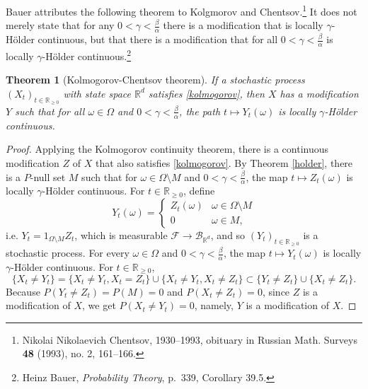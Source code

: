 \documentclass{article}
\newtheorem{theorem}{Theorem}
\theoremstyle{definition}
\begin{document}
Bauer attributes the following theorem to Kolgmorov and Chentsov.\footnote{Nikolai Nikolaevich Chentsov,
1930--1993,
 obituary in Russian Math. Surveys \textbf{48} (1993), no. 2, 161--166.}
 It does not merely state that for any
$0<\gamma<\frac{\beta}{\alpha}$ there is a modification that is locally $\gamma$-H\"older continuous, but that
there is a modification that for all $0<\gamma<\frac{\beta}{\alpha}$ is locally
$\gamma$-H\"older continuous.\footnote{Heinz Bauer, {\em Probability Theory},
p.~339, Corollary 39.5.}

\begin{theorem}[Kolmogorov-Chentsov theorem]
If a stochastic process $(X_t)_{t \in \mathbb{R}_{\geq 0}}$ with state space $\mathbb{R}^d$ satisfies \eqref{kolmogorov},
then $X$ has a modification $Y$ such that for all $\omega \in \Omega$ and $0<\gamma<\frac{\beta}{\alpha}$,
the path $t \mapsto Y_t(\omega)$ is locally $\gamma$-H\"older continuous.
\end{theorem}
\begin{proof}
Applying the Kolmogorov continuity theorem, there is a continuous modification $Z$ of $X$ that 
also satisfies \eqref{kolmogorov}. 
By Theorem \ref{holder}, there is a $P$-null set $M$ such that for 
$\omega \in \Omega \setminus M$ and $0<\gamma<\frac{\beta}{\alpha}$,
the map
$t \mapsto Z_t(\omega)$ is locally $\gamma$-H\"older continuous.
For $t \in \mathbb{R}_{\geq 0}$, define
\[
Y_t(\omega) = \begin{cases}
Z_t(\omega)&\omega \in \Omega \setminus M\\
0&\omega \in M,
\end{cases}
\]
i.e. $Y_t = 1_{\Omega \setminus M} Z_t$, which is measurable $\mathscr{F} \to \mathscr{B}_{\mathbb{R}^d}$, and so
$(Y_t)_{t \in \mathbb{R}_{\geq 0}}$ is a stochastic process. For every $\omega \in \Omega$ and $0<\gamma<\frac{\beta}{\alpha}$, the map
$t \mapsto Y_t(\omega)$ is locally $\gamma$-H\"older continuous. 
For $t \in \mathbb{R}_{\geq 0}$,
\[
\{X_t \neq Y_t\} = \{X_t \neq Y_t, X_t = Z_t\} \cup \{X_t \neq Y_t, X_t \neq Z_t\}
\subset \{Y_t \neq Z_t\} \cup \{X_t \neq Z_t\}.
\]
Because $P(Y_t \neq Z_t)=P(M)=0$ and $P(X_t \neq Z_t)=0$, since $Z$ is a modification of $X$, we get
$P(X_t \neq Y_t)=0$, namely, $Y$ is a modification of $X$.
\end{proof}
\end{document}
